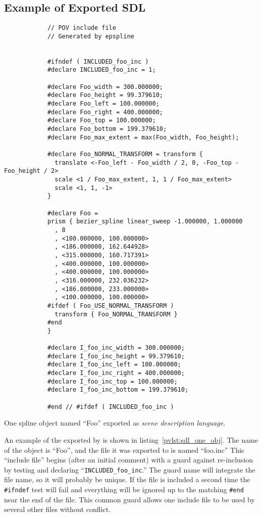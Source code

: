 		\subsection{Example of Exported SDL}%
		\label{ssec:ex_sdl_exported}
		\begin{povsdl}
			{\small
			\begin{verbatim}
			// POV include file
			// Generated by epspline
			
			
			#ifndef ( INCLUDED_foo_inc )
			#declare INCLUDED_foo_inc = 1;
			
			#declare Foo_width = 300.000000;
			#declare Foo_height = 99.379610;
			#declare Foo_left = 100.000000;
			#declare Foo_right = 400.000000;
			#declare Foo_top = 100.000000;
			#declare Foo_bottom = 199.379610;
			#declare Foo_max_extent = max(Foo_width, Foo_height);
			
			#declare Foo_NORMAL_TRANSFORM = transform {
			  translate <-Foo_left - Foo_width / 2, 0, -Foo_top - Foo_height / 2>
			  scale <1 / Foo_max_extent, 1, 1 / Foo_max_extent>
			  scale <1, 1, -1>
			}
			
			#declare Foo =
			prism { bezier_spline linear_sweep -1.000000, 1.000000
			  , 8
			  , <100.000000, 100.000000>
			  , <186.000000, 162.644928>
			  , <315.000000, 160.717391>
			  , <400.000000, 100.000000>
			  , <400.000000, 100.000000>
			  , <316.000000, 232.036232>
			  , <186.000000, 233.000000>
			  , <100.000000, 100.000000>
			#ifdef ( Foo_USE_NORMAL_TRANSFORM )
			  transform { Foo_NORMAL_TRANSFORM }
			#end
			}
			
			#declare I_foo_inc_width = 300.000000;
			#declare I_foo_inc_height = 99.379610;
			#declare I_foo_inc_left = 100.000000;
			#declare I_foo_inc_right = 400.000000;
			#declare I_foo_inc_top = 100.000000;
			#declare I_foo_inc_bottom = 199.379610;
			
			#end // #ifdef ( INCLUDED_foo_inc )
			\end{verbatim}
			}%
		\caption{One spline object named ``Foo'' exported as
			\emph{scene description language}.}
		\label{pvlst:sdl_one_obj}
		\end{povsdl}
	
		An example of the  exported by \IXpkg{}
		is shown in listing~\ref{pvlst:sdl_one_obj}.
		The name of the object is ``Foo'', and the file it was
		exported to is named ``foo.inc''
		This ``include file'' begins (after an initial
		comment) with a guard against re-inclusion by testing and
		declaring
		``\texttt{INCLUDED\_foo\_inc}.''
		The guard name will
		integrate the file name, so it will probably
		be unique. If the file is
		included a second time the \texttt{\#ifndef} test will fail
		and everything will be ignored up to the matching
		\texttt{\#end} near the end of the file. This common guard
		allows one include file to be used by several other files
		without conflict.
		
